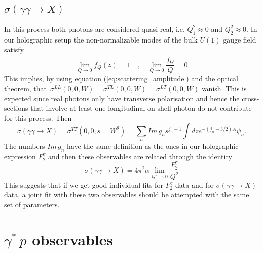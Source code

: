 \documentclass[preprint, 12pt]{elsarticle}
\begin{document}
\subsection{$\sigma\left(\gamma \gamma \rightarrow X\right)$}
In this process both photons are considered quasi-real, i.e. $Q_1^2 \approx 0$ and $Q_2^2 \approx 0$. In our holographic setup the non-normalizable modes of the bulk $U\left(1\right)$ gauge field
satisfy
\begin{equation}
\lim_{Q \rightarrow 0} f_Q \left(z\right) = 1 \quad , \quad \lim_{Q \rightarrow 0} \frac{\dot{f_Q}}{Q} = 0
\end{equation}
This implies, by using equation (\ref{eq:scattering_amplitude}) and the optical theorem, that~$\sigma^{LL}\left( 0, 0, W\right) = \sigma^{TL}\left(0, 0, W\right) = \sigma^{LT}\left(0, 0, W\right)$ vanish. This is expected since real photons only have transverse polarisation and hence the cross-sections that involve at least one longitudinal on-shell photon do not contribute for this process.
Then 
\begin{equation}
\sigma\left(\gamma \gamma \rightarrow X\right) =  \sigma^{TT}\left(0, 0, s = W^2\right) = \sum_n Im \, g_n s^{j_n - 1} \int dz e^{- \left( j_n - 3/2\right) A}  \psi_n.
\end{equation}
The numbers $Im \, g_n$ have the same definition as the ones in our  holographic expression $F_2^\gamma$ and then these observables are related through the identity
\begin{equation}
\sigma\left(\gamma \gamma \rightarrow X\right) = 4 \pi^2 \alpha \lim_{Q^2 \rightarrow 0} \frac{F_2^\gamma}{Q^2}
\end{equation}
This suggests that if we get good individual fits for $F^\gamma_2$ data and for $\sigma\left(\gamma \gamma \rightarrow X\right)$ data, a joint fit with these two observables should be attempted with the same set of parameters.



\section{$\gamma^*\, p$ observables}
\end{document}
